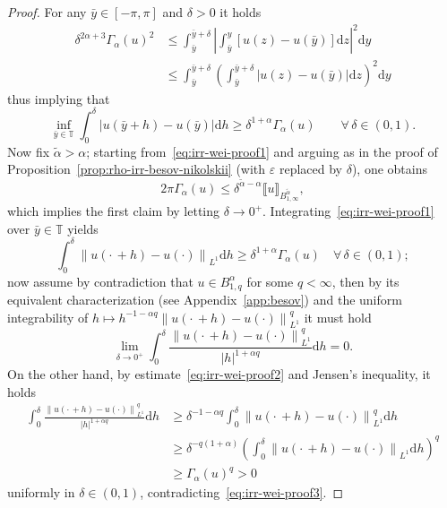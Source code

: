 \documentclass[11pt,oneside,reqno]{amsart}
\newcommand{\mathd}{\mathrm{d}}
\numberwithin{equation}{section}
\begin{document}
\begin{proof}
  For any $\bar{y} \in [- \pi, \pi]$ and $\delta > 0$ it holds
%  
  \begin{align*}
    \delta^{2 \alpha + 3} \Gamma_{\alpha} (u)^2 & \leqslant
    \int_{\bar{y}}^{\bar{y} + \delta} \left| \int_{\bar{y}}^y [u (z) - u
    (\bar{y})] \mathd z \right|^2 \mathd y\\
    & \leqslant \int_{\bar{y}}^{\bar{y} + \delta} \left(
    \int_{\bar{y}}^{\bar{y} + \delta} | u (z) - u (\bar{y}) | \mathd z
    \right)^2 \mathd y
  \end{align*}
%  
  thus implying that
  \begin{equation}
    \inf_{\bar{y} \in \mathbb{T}} \int_0^{\delta} | u (\bar{y} + h) - u
    (\bar{y}) | \mathd h \geqslant \delta^{1 + \alpha} \Gamma_{\alpha} (u)
    \qquad \forall \, \delta \in (0, 1) . \label{eq:irr-wei-proof1}
  \end{equation}
  Now fix $\tilde{\alpha} > \alpha$; starting from~\eqref{eq:irr-wei-proof1}
  and arguing as in the proof of
  Proposition~\ref{prop:rho-irr-besov-nikolskii} (with
  $\varepsilon$ replaced by $\delta$), one obtains
  \[ 2 \pi \Gamma_{\alpha} (u) \leqslant \delta^{\tilde{\alpha} - \alpha}
     \llbracket u \rrbracket_{B^{\tilde{\alpha}}_{1, \infty}}, \]
  which implies the first claim by letting $\delta \rightarrow 0^+$.
  Integrating~\eqref{eq:irr-wei-proof1} over $\bar{y} \in \mathbb{T}$ yields
  \begin{equation}
    \int_0^{\delta} \left\| u \left( \cdot \, + h \right) - u (\cdot)
    \right\|_{L^1} \mathd h \geqslant \delta^{1 + \alpha} \Gamma_{\alpha} (u)
    \quad \forall \, \delta \in (0, 1) ; \label{eq:irr-wei-proof2}
  \end{equation}
  now assume by contradiction that $u \in B^{\alpha}_{1, q}$ for some $q <
  \infty$, then by its equivalent characterization (see
  Appendix~\ref{app:besov}) and the uniform integrability of $h \mapsto h^{- 1
  - \alpha q} \left\| u \left( \cdot \, + h \right) - u (\cdot)
  \right\|^q_{L^1}$ it must hold
  \begin{equation}
    \lim_{\delta \rightarrow 0^+} \int_0^{\delta} \frac{\left\| u \left( \cdot
    \, + h \right) - u (\cdot) \right\|_{L^1}^q}{| h |^{1 + \alpha q}} \mathd
    h = 0. \label{eq:irr-wei-proof3}
  \end{equation}
  On the other hand, by estimate~\eqref{eq:irr-wei-proof2} and Jensen's
  inequality, it holds  
  \begin{align*}
    \int_0^{\delta} \frac{\left\| u \left( \cdot \, + h \right) - u (\cdot)
    \right\|_{L^1}^q}{| h |^{1 + \alpha q}} \mathd h & \geqslant \delta^{- 1 -
    \alpha q} \int_0^{\delta} \left\| u \left( \cdot \, + h \right) - u
    (\cdot) \right\|_{L^1}^q \mathd h\\
    & \geqslant \delta^{- q (1 + \alpha)} \left( \int_0^{\delta} \left\| u
    \left( \cdot \, + h \right) - u (\cdot) \right\|_{L^1} \mathd h
    \right)^q\\
    & \geqslant \Gamma_{\alpha} (u)^q > 0
  \end{align*} 
  uniformly in $\delta \in (0, 1)$, contradicting~\eqref{eq:irr-wei-proof3}.
\end{proof}
\end{document}
